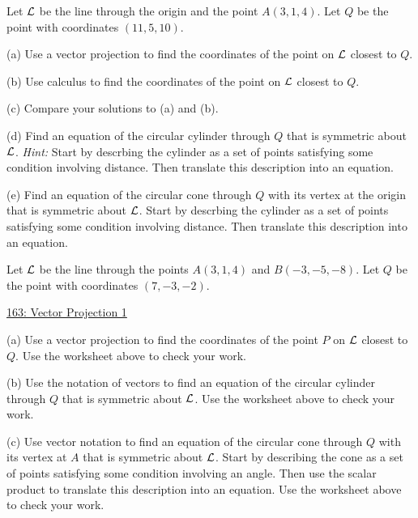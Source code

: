 \documentclass{ximera}
\begin{document}
\begin{question}  \label{Qfgsadge:Scalar}
Let ${\cal L}$ be the line through the origin and the point $A(3,1,4)$. Let $Q$ be the point with coordinates $(11,5,10)$.

(a) Use a vector projection to find the coordinates of the point on ${\cal L}$ closest to $Q$.

(b) Use calculus to find the coordinates of the point on ${\cal L}$ closest to $Q$.

(c) Compare your solutions to (a) and (b).

(d) Find an equation of the circular cylinder through $Q$ that is symmetric about ${\cal L}$. {\it Hint:} Start by descrbing the cylinder as a set of points satisfying some condition involving distance. Then translate this description into an equation.

(e) Find an equation of the circular cone through $Q$ with its vertex at the origin that is symmetric about ${\cal L}$. Start by descrbing the cylinder as a set of points satisfying some condition involving distance. Then translate this description into an equation.
\end{question}


\begin{question}  \label{Qfgs643r6e:Scalar}
Let ${\cal L}$ be the line through the points $A(3,1,4)$ and $B(-3,-5,-8)$. Let $Q$ be the point with coordinates $(7,-3,-2)$.

\begin{onlineOnly}
    \begin{center}
\end{center}
\end{onlineOnly}
 
\href{https://www.desmos.com/3d/gr3j5ocrm2}{163: Vector Projection 1}

(a) Use a vector projection to find the coordinates of the point $P$ on ${\cal L}$ closest to $Q$. Use the worksheet above to check your work.

(b) Use the notation of vectors to find an equation of the circular cylinder through $Q$ that is symmetric about ${\cal L}$. Use the worksheet above to check your work.

(c) Use vector notation to find an equation of the circular cone through $Q$ with its vertex at $A$ that is symmetric about ${\cal L}$. Start by describing the cone as a set of points satisfying some condition involving an angle. Then use the scalar product to translate this description into an equation. Use the worksheet above to check your work.




\end{question}
\end{document}
